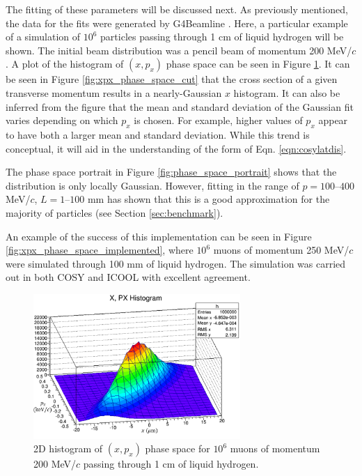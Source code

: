The fitting of these parameters will be discussed next. As previously mentioned, the data for the fits were generated by G4Beamline \cite{g4bl}. Here, a particular example of a simulation of $10^6$ particles passing through 1 cm of liquid hydrogen will be shown. The initial beam distribution was a pencil beam of momentum 200 MeV/$c$. A plot of the histogram of $(x,p_x)$ phase space can be seen in Figure \ref{fig:xpx_phase_space}. It can be seen in Figure \ref{fig:xpx_phase_space_cut} that the cross section of a given transverse momentum results in a nearly-Gaussian $x$ histogram. It can also be inferred from the figure that the mean and standard deviation of the Gaussian fit varies depending on which $p_x$ is chosen. For example, higher values of $p_x$ appear to have both a larger mean and standard deviation. While this trend is conceptual, it will aid in the understanding of the form of Eqn. \ref{eqn:cosylatdis}.

The phase space portrait in Figure \ref{fig:phase_space_portrait} shows that the distribution is only locally Gaussian. However, fitting in the range of $p=100\text{--}400$ MeV/$c$, $L=1\text{--}100$ mm has shown that this is a good approximation for the majority of particles (see Section \ref{sec:benchmark}).

An example of the success of this implementation can be seen in Figure \ref{fig:xpx_phase_space_implemented}, where $10^6$ muons of momentum 250 MeV/$c$ were simulated through 100 mm of liquid hydrogen. The simulation was carried out in both COSY and ICOOL \cite{icool} with excellent agreement.

\begin{figure}[H]
  \centering
    \includegraphics[width=0.7\textwidth]{Figures/xpx_phase_space} 
  \caption[2D histogram of $(x,p_x)$ phase space.]{2D histogram of $(x,p_x)$ phase space for $10^6$ muons of momentum 200 MeV/$c$ passing through 1 cm of liquid hydrogen.}
  \label{fig:xpx_phase_space}
\end{figure}


